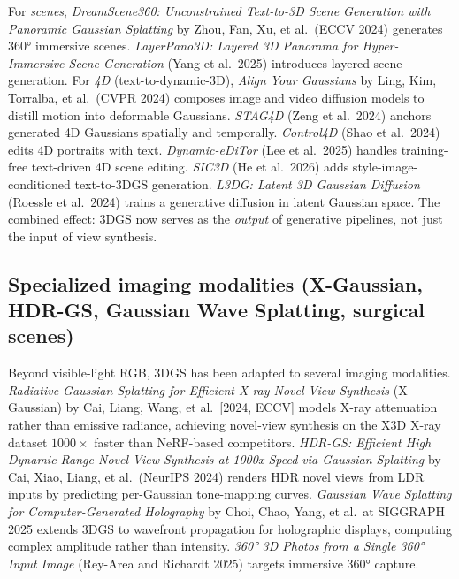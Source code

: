 \documentclass{article}
\begin{document}
For \emph{scenes}, \emph{DreamScene360: Unconstrained Text-to-3D Scene Generation with Panoramic Gaussian Splatting} by Zhou, Fan, Xu, et al.~(ECCV 2024) generates 360° immersive scenes. \emph{LayerPano3D: Layered 3D Panorama for Hyper-Immersive Scene Generation} (Yang et al.~2025) introduces layered scene generation. For \emph{4D} (text-to-dynamic-3D), \emph{Align Your Gaussians} by Ling, Kim, Torralba, et al.~(CVPR 2024) \cite{ling2024alignyourgaussians} composes image and video diffusion models to distill motion into deformable Gaussians. \emph{STAG4D} (Zeng et al.~2024) anchors generated 4D Gaussians spatially and temporally. \emph{Control4D} (Shao et al.~2024) edits 4D portraits with text. \emph{Dynamic-eDiTor} (Lee et al.~2025) handles training-free text-driven 4D scene editing. \emph{SIC3D} (He et al.~2026) adds style-image-conditioned text-to-3DGS generation. \emph{L3DG: Latent 3D Gaussian Diffusion} (Roessle et al.~2024) trains a generative diffusion in latent Gaussian space. The combined effect: 3DGS now serves as the \emph{output} of generative pipelines, not just the input of view synthesis.

\subsection{Specialized imaging modalities (X-Gaussian, HDR-GS, Gaussian Wave Splatting, surgical scenes)}\label{specialized-imaging-modalities-x-gaussian-hdr-gs-gaussian-wave-splatting-surgical-scenes}

Beyond visible-light RGB, 3DGS has been adapted to several imaging modalities. \emph{Radiative Gaussian Splatting for Efficient X-ray Novel View Synthesis} (X-Gaussian) by Cai, Liang, Wang, et al.~{[}2024, ECCV{]} \cite{cai2024hdrgsefficienthigh} models X-ray attenuation rather than emissive radiance, achieving novel-view synthesis on the X3D X-ray dataset \(1000\times\) faster than NeRF-based competitors. \emph{HDR-GS: Efficient High Dynamic Range Novel View Synthesis at 1000x Speed via Gaussian Splatting} by Cai, Xiao, Liang, et al.~(NeurIPS 2024) renders HDR novel views from LDR inputs by predicting per-Gaussian tone-mapping curves. \emph{Gaussian Wave Splatting for Computer-Generated Holography} by Choi, Chao, Yang, et al.~at SIGGRAPH 2025 \cite{choi2025gaussianwavesplatt} extends 3DGS to wavefront propagation for holographic displays, computing complex amplitude rather than intensity. \emph{360° 3D Photos from a Single 360° Input Image} (Rey-Area and Richardt 2025) targets immersive 360° capture.
\end{document}
